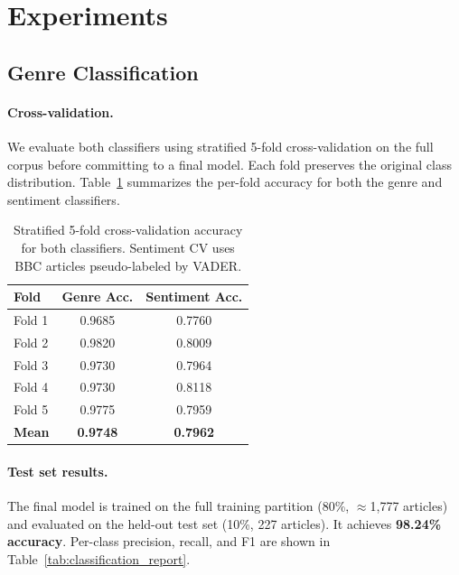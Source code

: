 \section{Experiments}
\label{sec:experiments}

\subsection{Genre Classification}

\paragraph{Cross-validation.}
We evaluate both classifiers using stratified 5-fold cross-validation on the full corpus before committing to a final model. Each fold preserves the original class distribution. Table~\ref{tab:cv} summarizes the per-fold accuracy for both the genre and sentiment classifiers.

\begin{table}[h]
\centering
\begin{tabular}{lcc}
\toprule
\textbf{Fold} & \textbf{Genre Acc.} & \textbf{Sentiment Acc.} \\
\midrule
Fold 1 & 0.9685 & 0.7760 \\
Fold 2 & 0.9820 & 0.8009 \\
Fold 3 & 0.9730 & 0.7964 \\
Fold 4 & 0.9730 & 0.8118 \\
Fold 5 & 0.9775 & 0.7959 \\
\midrule
\textbf{Mean} & \textbf{0.9748} & \textbf{0.7962} \\
\bottomrule
\end{tabular}
\caption{Stratified 5-fold cross-validation accuracy for both classifiers. Sentiment CV uses BBC articles pseudo-labeled by VADER.}
\label{tab:cv}
\end{table}

\paragraph{Test set results.}
The final model is trained on the full training partition (80\%, $\approx$1,777 articles) and evaluated on the held-out test set (10\%, 227 articles). It achieves \textbf{98.24\% accuracy}. Per-class precision, recall, and F1 are shown in Table~\ref{tab:classification_report}.


